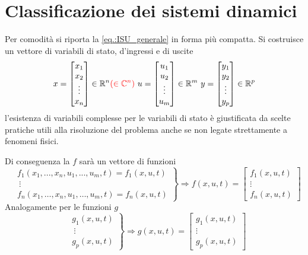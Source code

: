 \newpage
\section{Classificazione dei sistemi dinamici}
Per comodità si riporta la \ref{eq.:ISU_generale} in forma più compatta.
Si costruisce un vettore di variabili di stato, d'ingressi e di uscite
$$
x = \begin{bmatrix}
x_1\\
x_2\\
\vdots\\
x_n
\end{bmatrix} \in \mathbb{R}^n \textcolor{red}{\left(\in\mathbb{C}^n\right)}\
u=\begin{bmatrix}
u_1\\
u_2\\
\vdots\\
u_m
\end{bmatrix}\in\mathbb{R}^m\
y=\begin{bmatrix}
y_1\\
y_2\\
\vdots\\
y_p
\end{bmatrix}\in \mathbb{R}^p
$$
l'esistenza di variabili complesse per le variabili di stato è giustificata da scelte pratiche
utili alla risoluzione del problema anche se non legate strettamente a fenomeni fisici.

Di conseguenza la $f$ sarà un vettore di funzioni
$$\left.\begin{aligned}
&f_1\left(x_1,...,x_n,u_1,...,u_m,t\right)=f_1(x,u,t)\\
&\ \vdots\\
&f_n\left(x_1,\ldots,x_n,u_1,\ldots,u_m,t\right)=f_n(x,u,t)
\end{aligned}\right\} \Rightarrow f(x,u,t)=\begin{bmatrix}
f_1(x,u,t)\\
\vdots\\
f_n(x,u,t)
\end{bmatrix}
$$
Analogamente per le funzioni $g$
$$
\left.\begin{aligned}
&g_1(x,u,t)\\
&\ \vdots\\
&g_p(x,u,t)
\end{aligned}\right\}\Rightarrow
g(x,u,t) = \begin{bmatrix}
g_1(x,u,t)\\
\vdots\\
g_p(x,u,t)
\end{bmatrix}
$$

